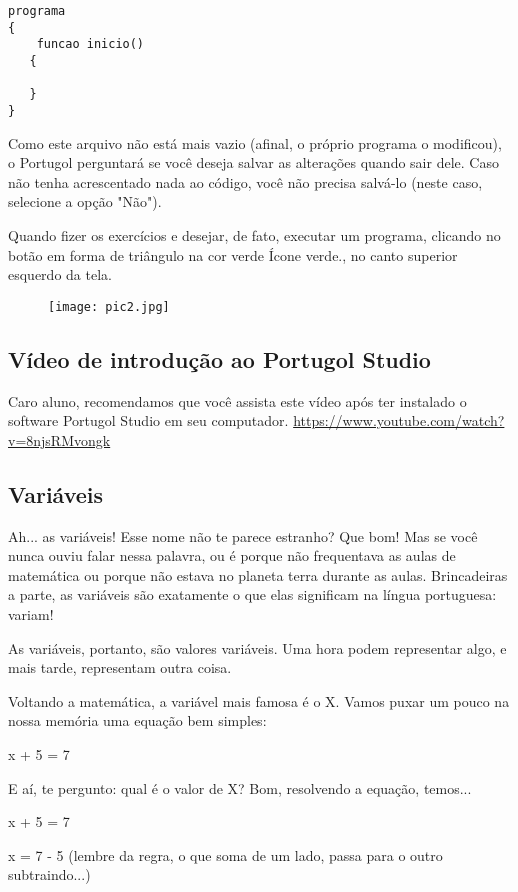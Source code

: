 \documentclass{article}
\begin{document}
\begin{lstlisting}
programa
{
    funcao inicio()
   {

   }
}
\end{lstlisting}

Como este arquivo não está mais vazio (afinal, o próprio programa o modificou), o Portugol perguntará se você deseja salvar as alterações quando sair dele. Caso não tenha acrescentado nada ao código, você não precisa salvá-lo (neste caso, selecione a opção "Não").

Quando fizer os exercícios e desejar, de fato, executar um programa, clicando no botão em forma de triângulo na cor verde Ícone verde., no canto superior esquerdo da tela.

\begin{figure}[H]
    \centering
    \texttt{[image: pic2.jpg]}
    \label{fig:pic2}
\end{figure}

\subsection{Vídeo de introdução ao Portugol Studio}
Caro aluno, recomendamos que você assista este vídeo após ter instalado o software Portugol Studio em seu computador.
\href{https://www.youtube.com/watch?v=8njsRMvongk}{https://www.youtube.com/watch?v=8njsRMvongk}

\subsection{Variáveis}

Ah... as variáveis! Esse nome não te parece estranho? Que bom! Mas se você nunca ouviu falar nessa palavra, ou é porque não frequentava as aulas de matemática ou porque não estava no planeta terra durante as aulas. Brincadeiras a parte, as variáveis são exatamente o que elas significam na língua portuguesa: variam!

As variáveis, portanto, são valores variáveis. Uma hora podem representar algo, e mais tarde, representam outra coisa.

Voltando a matemática, a variável mais famosa é o X. Vamos puxar um pouco na nossa memória uma equação bem simples:

x + 5 = 7

E aí, te pergunto: qual é o valor de X? Bom, resolvendo a equação, temos...

x + 5 = 7

x = 7 - 5 (lembre da regra, o que soma de um lado, passa para o outro subtraindo...)
\end{document}
